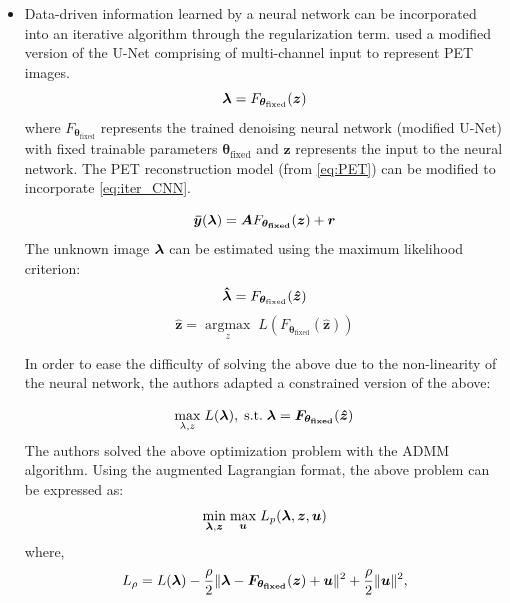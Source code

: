 \begin{itemize}


\item Data-driven information learned by a neural network can be incorporated into an iterative algorithm through the regularization term. \cite{gong2019iterative} used a modified version of the U-Net comprising of multi-channel input to represent \ac{PET} images.
\begin{equation}\label{eq:iter_CNN}
\bm{\lambda} = F_{\bm{\theta}_{\mathrm{fixed}}}(\bm{z})
\end{equation} 
where $F_{\bm{\theta_{\mathrm{fixed}}}}$ represents the trained denoising neural network (modified U-Net) with fixed trainable parameters $\bm{\theta_{\mathrm{fixed}}}$ and $\bm{z}$ represents the input to the neural network. The \ac{PET} reconstruction model (from \ref{eq:PET}) can be modified to incorporate \ref{eq:iter_CNN}. 

\begin{equation}\label{eq:mod_PET}
	\bm{\bar{y}}(\bm{\lambda}) = \bm{A} F_{\bm{\theta_{\mathrm{fixed}}}}(\bm{z}) + \bm{r}
\end{equation}
The unknown image $\bm{\lambda}$ can be estimated using the maximum likelihood criterion:
\begin{equation}\label{eq:iter_CNN2}
\bm{\hat{\lambda}} = F_{\bm{\theta}_{\mathrm{fixed}}}(\bm{\hat{z}})
\end{equation} 
\begin{equation}
\bm{\hat{z}} = \underset{z}{\operatorname{argmax}} \; L(F_{\bm{\theta}_{\mathrm{fixed}}}(\bm{\hat{z}}))
\end{equation}

In order to ease the difficulty of solving the above due to the non-linearity of the neural network, the authors adapted a constrained version of the above:

\begin{equation}\label{constr}
 	\underset{\lambda,z}{\operatorname{max}} \; L(\bm{\bm{\lambda}}),  \; \mathrm{s.t.} \; \bm{\lambda} = \bm{F}_{\bm{\theta_{\mathrm{fixed}}}}(\bm{\hat{z}})
\end{equation}
The authors solved the above optimization problem with the \ac{ADMM} algorithm. Using the augmented Lagrangian format, the above problem can be expressed as:
\begin{equation}
	\underset{\bm{\lambda},\bm{z}}{\operatorname{min}} \; \underset{\bm{u}}{\operatorname{max}} \; L_{p} (\bm{\lambda},\bm{z},\bm{u}) 
\end{equation}
where,
\begin{equation}
L_{\rho}=L(\bm{\lambda})-\frac{\rho}{2}\|\bm{\lambda}-\bm{F}_{\bm{\theta_{\mathrm{fixed}}}}(\bm{z})+\bm{u}\|^{2}+\frac{\rho}{2}\|\bm{u}\|^{2},
\end{equation}


\end{itemize}
